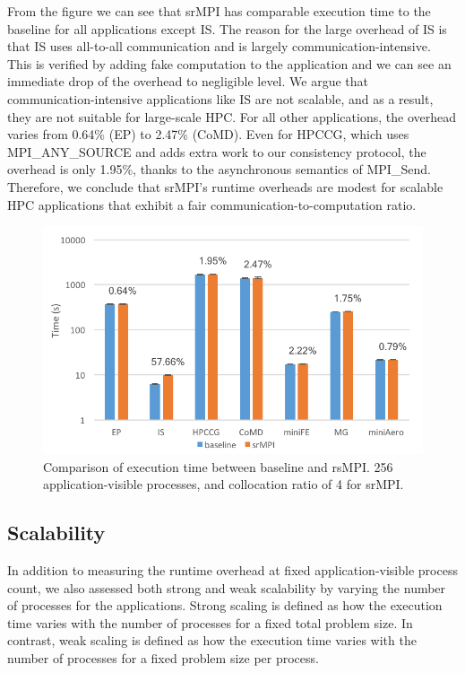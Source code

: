 From the figure we can see that srMPI has comparable execution time to the baseline for all applications except IS. The reason for the large overhead of IS is that IS uses all-to-all communication and is largely communication-intensive. This is verified by adding fake computation to the application and we can see an immediate drop of the overhead to negligible level. We argue that communication-intensive applications like IS are not scalable, and as a result, they are not suitable for large-scale HPC. 
For all other applications, the overhead varies from 0.64\% (EP) to 2.47\% (CoMD). Even for HPCCG, which uses MPI\_ANY\_SOURCE and adds extra work to our consistency protocol, the overhead is only 1.95\%, thanks to the asynchronous semantics of MPI\_Send. Therefore, we conclude that srMPI's runtime overheads are modest for scalable HPC applications that exhibit a fair communication-to-computation ratio.

\begin{figure}[!t]
  \begin{center}
      \includegraphics[width=\columnwidth]{figures/runtime_overhead}
  \end{center}
  \caption{Comparison of execution time between baseline and rsMPI. 256 application-visible processes, and collocation ratio of 4 for srMPI.}
  \label{fig:runtime_overhead}
\end{figure}

\subsection{Scalability}
In addition to measuring the runtime overhead at fixed application-visible process count, we also assessed both strong and weak scalability by varying the number of processes for the applications. Strong scaling is defined as how the execution time varies with the number of processes for a fixed total problem size. In contrast, weak scaling is defined as how the execution time varies with the number of processes for a fixed problem size per process. 

